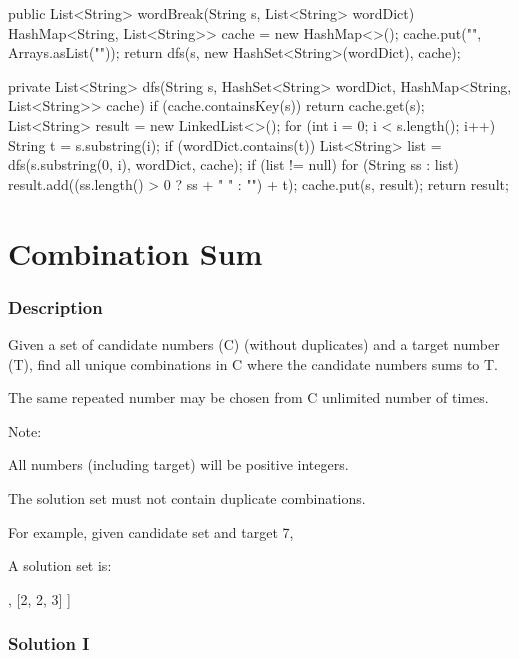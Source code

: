 \begin{Code}
public List<String> wordBreak(String s, List<String> wordDict) {
    HashMap<String, List<String>> cache = new HashMap<>();
    cache.put("", Arrays.asList(""));
    return dfs(s, new HashSet<String>(wordDict), cache);
}

private List<String> dfs(String s, HashSet<String> wordDict, HashMap<String, List<String>> cache) {
    if (cache.containsKey(s)) {
        return cache.get(s);
    }
    List<String> result = new LinkedList<>();
    for (int i = 0; i < s.length(); i++) {
        String t = s.substring(i);
        if (wordDict.contains(t)) {
            List<String> list = dfs(s.substring(0, i), wordDict, cache);
            if (list != null) {
                for (String ss : list) {
                    result.add((ss.length() > 0 ? ss + " " : "") + t);
                }
            }
        }
    }
    cache.put(s, result);
    return result;
}
\end{Code}

\newpage

\section{Combination Sum} %

\subsubsection{Description}

Given a set of candidate numbers (C) (without duplicates) and a target number (T), find all unique combinations in C where the candidate numbers sums to T.

The same repeated number may be chosen from C unlimited number of times.

Note:

All numbers (including target) will be positive integers.

The solution set must not contain duplicate combinations.

For example, given candidate set \code{[2, 3, 6, 7]} and target 7,

A solution set is:
\begin{code}
[
  [7],
  [2, 2, 3]
]
\end{code}

\subsubsection{Solution I}

